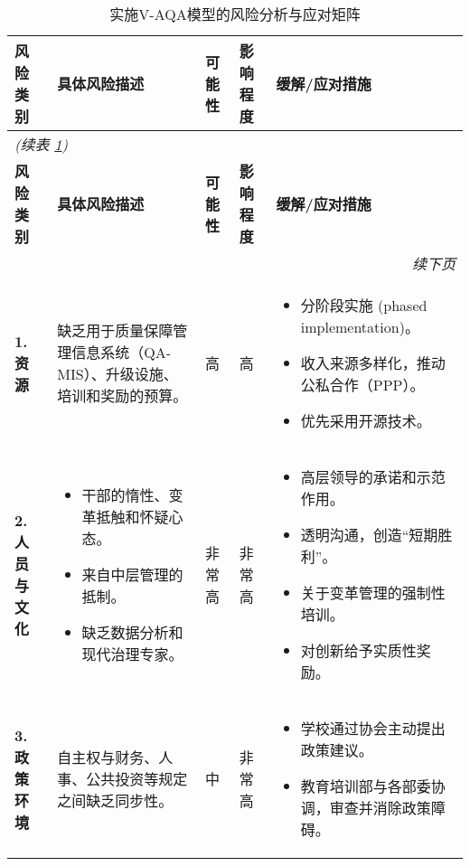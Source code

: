 \renewcommand{\arraystretch}{1.3} %

\begin{longtable}{|p{2.5cm}|p{5cm}|p{1.5cm}|p{1.5cm}|p{5cm}|}
\caption{实施V-AQA模型的风险分析与应对矩阵}
\label{tab:risk_matrix}\\
\hline
\textbf{风险类别} & \textbf{具体风险描述} & \textbf{可能性} & \textbf{影响程度} & \textbf{缓解/应对措施} \\
\hline
\endfirsthead
\multicolumn{5}{l}{\textit{(续表 \ref{tab:risk_matrix})}}\\\hline
\textbf{风险类别} & \textbf{具体风险描述} & \textbf{可能性} & \textbf{影响程度} & \textbf{缓解/应对措施} \\
\hline
\endhead
\hline \multicolumn{5}{r}{\textit{续下页}}\\
\endfoot
\hline
\endlastfoot

\textbf{1. 资源} &
缺乏用于质量保障管理信息系统（QA-MIS）、升级设施、培训和奖励的预算。 &
高 &
高 &
\begin{itemize}
  \item 分阶段实施 (phased implementation)。
  \item 收入来源多样化，推动公私合作（PPP）。
  \item 优先采用开源技术。
\end{itemize} \\
\hline

\textbf{2. 人员与文化} &
\begin{itemize}
  \item 干部的惰性、变革抵触和怀疑心态。
  \item 来自中层管理的抵制。
  \item 缺乏数据分析和现代治理专家。
\end{itemize} &
非常高 &
非常高 &
\begin{itemize}
  \item 高层领导的承诺和示范作用。
  \item 透明沟通，创造“短期胜利”。
  \item 关于变革管理的强制性培训。
  \item 对创新给予实质性奖励。
\end{itemize} \\
\hline

\textbf{3. 政策环境} &
自主权与财务、人事、公共投资等规定之间缺乏同步性。 &
中 &
非常高 &
\begin{itemize}
  \item 学校通过协会主动提出政策建议。
  \item 教育培训部与各部委协调，审查并消除政策障碍。
\end{itemize} \\
\hline

\end{longtable}
    


